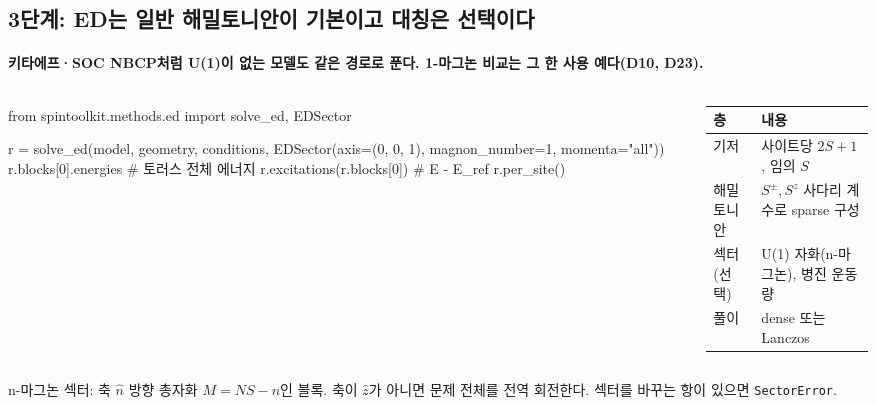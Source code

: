 \subsection{3단계: ED는 일반 해밀토니안이 기본이고 대칭은 선택이다}\label{stage3-ed-design}
\begingroup%
  \framesubtitle{키타에프·SOC NBCP처럼 U(1)이 없는 모델도 같은 경로로 푼다. 1-마그논 비교는 그 한 사용 예다(D10, D23).}
  \begin{columns}[T,onlytextwidth]
    \begin{column}{0.52\textwidth}
\begin{semiverbatim}\scriptsize
from spintoolkit.methods.ed import solve_ed, EDSector

r = solve_ed(model, geometry, conditions,
             EDSector(axis=(0, 0, 1),
                      magnon_number=1,
                      momenta="all"))
r.blocks[0].energies     # 토러스 전체 에너지
r.excitations(r.blocks[0])  # E - E_ref
r.per_site()
\end{semiverbatim}
    \end{column}
    \begin{column}{0.45\textwidth}
      \small
      \begin{tabular}{@{}P{1.5cm}P{3.6cm}@{}}
        \toprule
        층 & 내용 \\
        \midrule
        기저 & 사이트당 $2S+1$, 임의 $S$ \\
        해밀토니안 & $S^\pm,S^z$ 사다리 계수로 sparse 구성 \\
        섹터(선택) & U(1) 자화(n-마그논), 병진 운동량 \\
        풀이 & dense 또는 Lanczos \\
        \bottomrule
      \end{tabular}
    \end{column}
  \end{columns}
  \par\medskip
  \small n-마그논 섹터: 축 $\hat n$ 방향 총자화 $M=NS-n$인 블록. 축이 $\hat z$가 아니면 문제 전체를 전역 회전한다. 섹터를 바꾸는 항이 있으면 \texttt{SectorError}.
  \par\medskip
\endgroup


